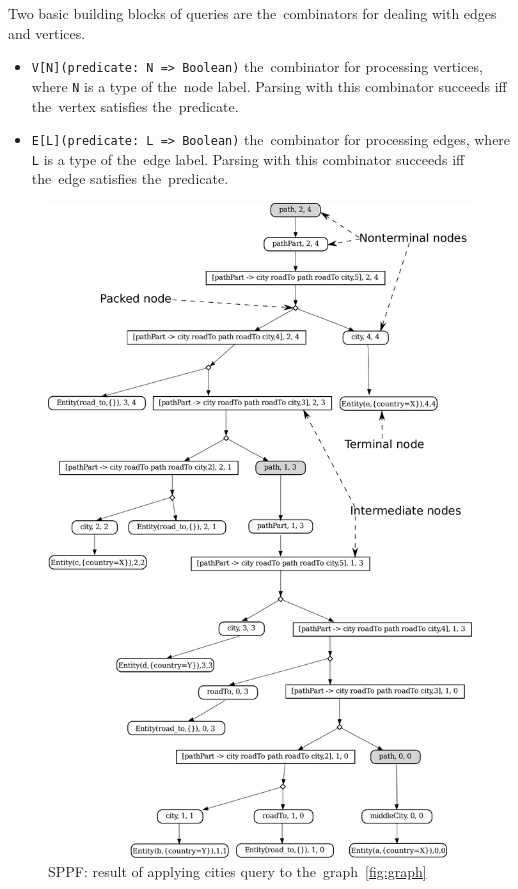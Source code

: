 Two basic building blocks of queries are the~combinators for dealing with edges and vertices.
\begin{itemize}
    \item \lstinline{V[N](predicate: N => Boolean)} the~combinator for processing vertices, where \lstinline{N} is a type of the~node label.
    Parsing with this combinator succeeds iff the~vertex satisfies the~predicate.
    \item \lstinline{E[L](predicate: L => Boolean)} the~combinator for processing edges, where \lstinline{L} is a type of the~edge label.
    Parsing with this combinator succeeds iff the~edge satisfies the~predicate.
\end{itemize}

\begin{figure}[t]
\includegraphics[width=\columnwidth]{sppf}
\caption{SPPF: result of applying cities query to the~graph~\ref{fig:graph}}
\label{fig:sppf}
\end{figure}

